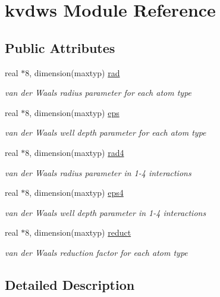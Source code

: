 \hypertarget{classkvdws}{\section{kvdws Module Reference}
\label{classkvdws}
}
\subsection*{Public Attributes}
\begin{DoxyCompactItemize}
\item 
real $\ast$8, dimension(maxtyp) \hyperlink{classkvdws_a872caf055db208ba30e715cba39a8c48}{rad}
\begin{DoxyCompactList}\small\item\em van der Waals radius parameter for each atom type \end{DoxyCompactList}\item 
real $\ast$8, dimension(maxtyp) \hyperlink{classkvdws_ad41b05e196583b3801e848f38634cb12}{eps}
\begin{DoxyCompactList}\small\item\em van der Waals well depth parameter for each atom type \end{DoxyCompactList}\item 
real $\ast$8, dimension(maxtyp) \hyperlink{classkvdws_a053949b49e313785d3ed38ddea00c9b1}{rad4}
\begin{DoxyCompactList}\small\item\em van der Waals radius parameter in 1-\/4 interactions \end{DoxyCompactList}\item 
real $\ast$8, dimension(maxtyp) \hyperlink{classkvdws_a13ae795c08066b577b8f2653e49b390c}{eps4}
\begin{DoxyCompactList}\small\item\em van der Waals well depth parameter in 1-\/4 interactions \end{DoxyCompactList}\item 
real $\ast$8, dimension(maxtyp) \hyperlink{classkvdws_ab8384b54fc7099480240100d4c8dea06}{reduct}
\begin{DoxyCompactList}\small\item\em van der Waals reduction factor for each atom type \end{DoxyCompactList}\end{DoxyCompactItemize}


\subsection{Detailed Description}


